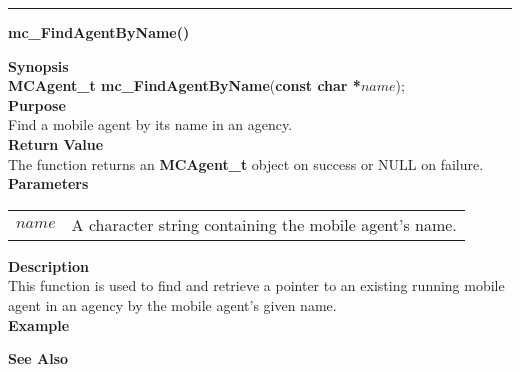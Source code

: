 \noindent
\vspace{5pt}
\rule{6.5in}{0.015in}
\noindent
{\LARGE \bf mc\_FindAgentByName()}\\
{}

\noindent
{\bf Synopsis}\\
{\bf MCAgent\_t mc\_FindAgentByName}({\bf const char *}$name$);\\

\noindent
{\bf Purpose}\\
Find a mobile agent by its name in an agency.\\

\noindent
{\bf Return Value}\\
The function returns an {\bf MCAgent\_t} object on success or NULL on failure.\\

\noindent
{\bf Parameters}
\vspace{-0.1in}
\begin{description}
\item
\begin{tabular}{p{10 mm}p{145 mm}}
$name$ & A character string containing the mobile agent's name.
\end{tabular}
\end{description}

\noindent
{\bf Description}\\
This function is used to find and retrieve a pointer to an existing running 
mobile agent in an agency by the mobile agent's given name.\\

\noindent
{\bf Example}\\
\noindent
{\footnotesize}

\noindent
{\bf See Also}\\

